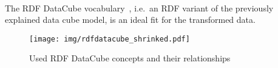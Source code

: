 \documentclass[sw]{iosart2x}
\begin{document}

\paragraph{}
The RDF DataCube vocabulary~\cite{rdfdatacube}, i.e.~an RDF variant of the previously explained data cube model, is an ideal fit for the transformed data. 
\begin{figure}[h]
\texttt{[image: img/rdfdatacube\_shrinked.pdf]}
\caption{Used RDF DataCube concepts and their relationships\protect\footnotemark}
\label{fig:rdfdatacube}
\end{figure}
\end{document}
